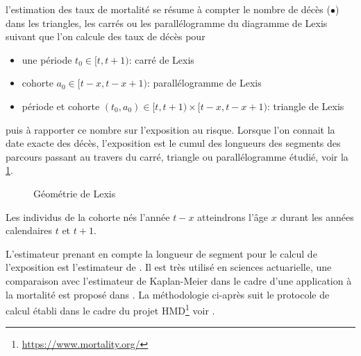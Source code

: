 l'estimation des taux de mortalité se résume à compter le nombre de décès ($\bullet$) dans les triangles, les carrés ou les parallélogramme du diagramme de Lexis suivant que l'on calcule des taux de décès pour
\begin{itemize}
  \item une période $t_0\in[t, t+1)$: carré de Lexis
  \item cohorte $a_0\in[t-x, t-x+1)$: parallélogramme de Lexis
  \item période et cohorte $(t_0,a_0)\in[t, t+1)\times [t-x, t-x+1)$: triangle de Lexis
\end{itemize}

puis à rapporter ce nombre sur l'exposition au risque. Lorsque l'on connait la date exacte des décès, l'exposition est le cumul des longueurs des segments des parcours passant au travers du carré, triangle ou parallélogramme étudié, voir la \cref{fig:lexis_geom}. 
\begin{figure}[ht!]
\begin{center}
\caption{Géométrie de Lexis}
\label{fig:lexis_geom}
\end{center}
\end{figure}
Les individus de la cohorte nés l'année $t-x$ atteindrons l'âge $x$ durant les années calendaires $t$ et $t+1$.
\begin{remark}
L'estimateur prenant en compte la longueur de segment pour le calcul de l'exposition est l'estimateur de \citet{Hoem1971}. Il est très utilisé en sciences actuarielle, une comparaison avec l'estimateur de Kaplan-Meier dans le cadre d'une application à la mortalité est proposé dans \citet{Guibert2017}. La méthodologie ci-après suit le protocole de calcul établi dans le cadre du projet HMD\footnote{\url{https://www.mortality.org/}} voir \citet{Wilmoth2007}. 
\end{remark}
